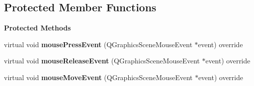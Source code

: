 \subsection*{Protected Member Functions}
\begin{Indent}\textbf{ Protected Methods}\par
\begin{DoxyCompactItemize}
\item 
\mbox{\label{classrev_1_1_view_1_1_timeline_scene_a00014597c5971ba1adfcf697ac58c471}} 
virtual void {\bfseries mouse\+Press\+Event} (Q\+Graphics\+Scene\+Mouse\+Event $\ast$event) override
\item 
\mbox{\label{classrev_1_1_view_1_1_timeline_scene_a6d8f0bb757b1c81a823fc1f6fcd3a81b}} 
virtual void {\bfseries mouse\+Release\+Event} (Q\+Graphics\+Scene\+Mouse\+Event $\ast$event) override
\item 
\mbox{\label{classrev_1_1_view_1_1_timeline_scene_a1df1d8589d3fd11b32b13608b01c2ee7}} 
virtual void {\bfseries mouse\+Move\+Event} (Q\+Graphics\+Scene\+Mouse\+Event $\ast$event) override
\end{DoxyCompactItemize}
\end{Indent}
